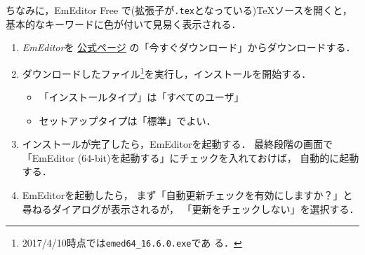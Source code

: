 \documentclass{ltjsarticle}
\begin{document}
ちなみに，EmEditor Free で(拡張子が\texttt{.tex}となっている)\TeX ソースを開くと，
基本的なキーワードに色が付いて見易く表示される．

\begin{enumerate}
\item \emph{EmEditor}を
  \href{http://jp.emeditor.com/}{公式ページ}%
  の「今すぐダウンロード」からダウンロードする．%
\item ダウンロードしたファイル\footnote{2017/4/10時点では\texttt{emed64\_16.6.0.exe}であ
    る．}を実行し，インストールを開始する．
  \begin{itemize}
  \item 「インストールタイプ」は「すべてのユーザ」
  \item セットアップタイプは「標準」でよい．%
  \end{itemize}

\item インストールが完了したら，EmEditorを起動する．
  最終段階の画面で「EmEditor (64-bit)を起動する」にチェックを入れておけば，
  自動的に起動する．

\item %
  EmEditorを起動したら，%
  まず「自動更新チェックを有効にしますか？」と尋ねるダイアログが表示されるが，
  「更新をチェックしない」を選択する．


\end{enumerate}
\end{document}
